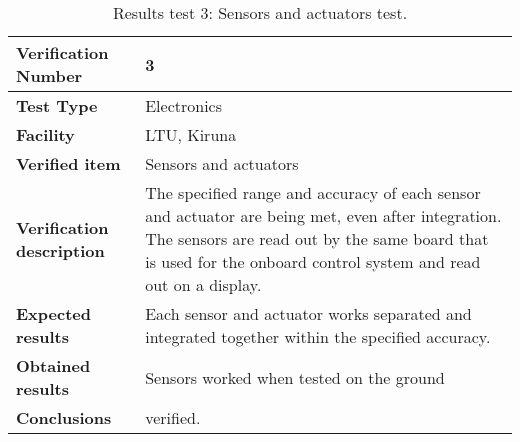 \begin{table}[H]
\centering

\begin{tabular}{|m{}| m{} |}
\hline
\textbf{Verification Number} 		& 3 					\\ \hline
\textbf{Test Type} 					& Electronics 			\\ \hline
\textbf{Facility} 					& LTU, Kiruna 			\\ \hline
\textbf{Verified item} 				& Sensors and actuators	\\ \hline

\textbf{Verification description} 	& The specified range and accuracy of each sensor and actuator are being met, even after integration. The sensors are read out by the same board that is used for the onboard control system and read out on a display. \\ \hline

\textbf{Expected results} 			& Each sensor and actuator works separated and integrated together within the specified accuracy. \\ \hline

\textbf{Obtained results} 			& Sensors worked when tested on the ground \\ \hline

\textbf{Conclusions} 				& verified.		\\ \hline
\end{tabular}
\caption{Results test 3: Sensors and actuators test.}
\label{tab:testresult3:electronics}
\end{table}


\raggedbottom